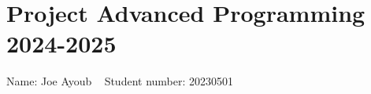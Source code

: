 \chapter{Project Advanced Programming 2024-\/2025}
\hypertarget{md_README}{}\label{md_README}
Name\+: Joe Ayoub ~\newline
 Student number\+: 20230501 